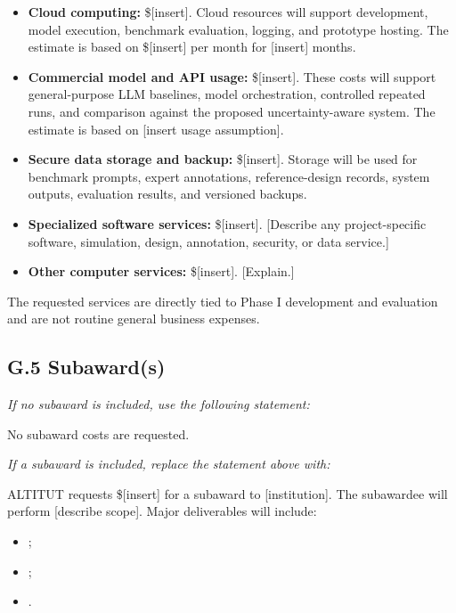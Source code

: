 \documentclass[11pt,letterpaper]{article}
\begin{document}
\begin{itemize}
    \item \textbf{Cloud computing:} \$[insert].
    Cloud resources will support development, model execution, benchmark
    evaluation, logging, and prototype hosting. The estimate is based on
    \$[insert] per month for [insert] months.

    \item \textbf{Commercial model and API usage:} \$[insert].
    These costs will support general-purpose LLM baselines, model
    orchestration, controlled repeated runs, and comparison against the
    proposed uncertainty-aware system. The estimate is based on [insert usage
    assumption].

    \item \textbf{Secure data storage and backup:} \$[insert].
    Storage will be used for benchmark prompts, expert annotations,
    reference-design records, system outputs, evaluation results, and versioned
    backups.

    \item \textbf{Specialized software services:} \$[insert].
    [Describe any project-specific software, simulation, design, annotation,
    security, or data service.]

    \item \textbf{Other computer services:} \$[insert].
    [Explain.]
\end{itemize}

The requested services are directly tied to Phase I development and
evaluation and are not routine general business expenses.

\subsection*{G.5 Subaward(s)}

\textit{If no subaward is included, use the following statement:}

No subaward costs are requested.

\medskip

\textit{If a subaward is included, replace the statement above with:}

ALTITUT requests \$[insert] for a subaward to [institution]. The subawardee
will perform [describe scope]. Major deliverables will include:

\begin{itemize}
    \item [Insert deliverable];
    \item [Insert deliverable];
    \item [Insert deliverable].
\end{itemize}
\end{document}
